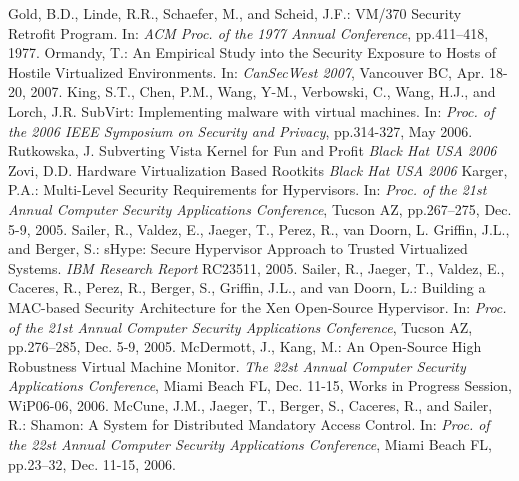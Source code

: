 \documentclass[11pt,a4paper]{llncs}
\begin{document}
\begin{thebibliography}{99}
{\sc Gold, B.D., Linde, R.R., Schaefer, M., and Scheid, J.F.:}
{\rm VM/370 Security Retrofit Program.}
In: {\em ACM Proc. of the 1977 Annual Conference}, pp.411--418, 1977.
{\sc Ormandy, T.:}
{\rm An Empirical Study into the Security Exposure to Hosts of Hostile
Virtualized Environments.}
In: {\em CanSecWest 2007}, Vancouver BC, Apr. 18-20, 2007.
{\sc King, S.T., Chen, P.M., Wang, Y-M., Verbowski, C., Wang, H.J., 
and Lorch, J.R.}
{\rm SubVirt: Implementing malware with virtual machines.}
In: {\em Proc. of the 2006 IEEE Symposium on Security and Privacy},
pp.314-327, May 2006.
{\sc Rutkowska, J.}
{\rm Subverting Vista Kernel for Fun and Profit}
{\em Black Hat USA 2006}
{\sc Zovi, D.D.}
{\rm Hardware Virtualization Based Rootkits}
{\em Black Hat USA 2006}
{\sc Karger, P.A.:}
{\rm Multi-Level Security Requirements for Hypervisors.}
In: {\em Proc. of the 21st Annual Computer Security Applications Conference}, 
Tucson AZ, pp.267--275, Dec. 5-9, 2005.
{\sc Sailer, R., Valdez, E., Jaeger, T., Perez, R., van Doorn, L.
Griffin, J.L., and Berger, S.:}
{\rm sHype: Secure Hypervisor Approach to Trusted Virtualized Systems.}
{\em IBM Research Report} RC23511, 2005.
{\sc Sailer, R., Jaeger, T., Valdez, E., Caceres, R., Perez, R., Berger, S.,
Griffin, J.L., and van Doorn, L.:}
{\rm Building a MAC-based Security Architecture for the Xen Open-Source
Hypervisor.}
In: {\em Proc. of the 21st Annual Computer Security Applications Conference}, 
Tucson AZ, pp.276--285, Dec. 5-9, 2005.
{\sc McDermott, J., Kang, M.:}
{\rm An Open-Source High Robustness Virtual Machine Monitor.}
{\em The 22st Annual Computer Security Applications Conference}, 
Miami Beach FL, Dec. 11-15, Works in Progress Session, WiP06-06, 2006.
{\sc McCune, J.M., Jaeger, T., Berger, S., Caceres, R., and Sailer, R.:}
{\rm Shamon: A System for Distributed Mandatory Access Control.}
In: {\em Proc. of the 22st Annual Computer Security Applications Conference}, 
Miami Beach FL, pp.23--32, Dec. 11-15, 2006.
\end{thebibliography}
\end{document}
